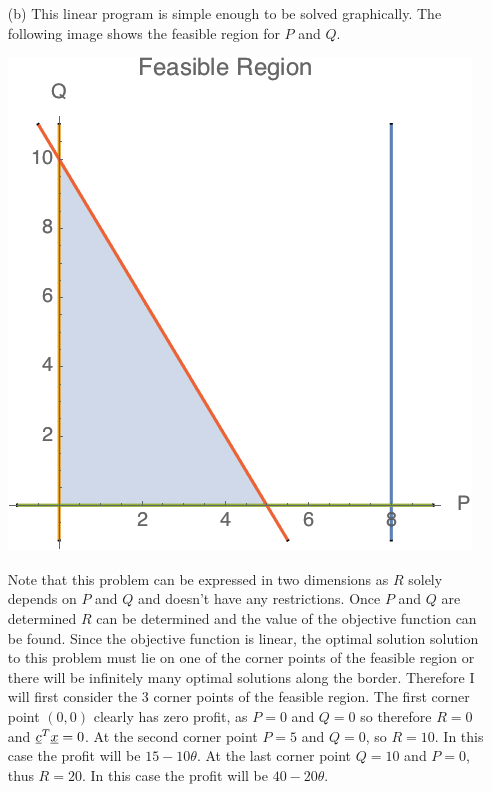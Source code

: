 \documentclass[11pt, oneside]{article}
\begin{document}
\begin{enumerate}
\begin{enumerate}
        \item[(b)]
          This linear program is simple enough to be solved graphically.
          The following image shows the feasible region for $P$ and $Q$.
          \begin{center}
            \includegraphics[scale=.7]{Figures/final_1}
          \end{center}
          Note that this problem can be expressed in two dimensions as $R$
          solely depends on $P$ and $Q$ and doesn't have any restrictions.
          Once $P$ and $Q$ are determined $R$ can be determined and the value of
          the objective function can be found.
          Since the objective function is linear, the optimal solution solution
          to this problem must lie on one of the corner points of the feasible
          region or there will be infinitely many optimal solutions along the
          border.
          Therefore I will first consider the 3 corner points of the feasible
          region.
          The first corner point $(0, 0)$ clearly has zero profit, as $P = 0$
          and $Q = 0$ so therefore $R = 0$ and $\underline{c}^T \underline{x} = 0$.
          At the second corner point $P = 5$ and $Q = 0$, so $R = 10$.
          In this case the profit will be $15 - 10\theta$.
          At the last corner point $Q = 10$ and $P = 0$, thus $R = 20$.
          In this case the profit will be $40 - 20\theta$.

\end{enumerate}
\end{enumerate}
\end{document}

